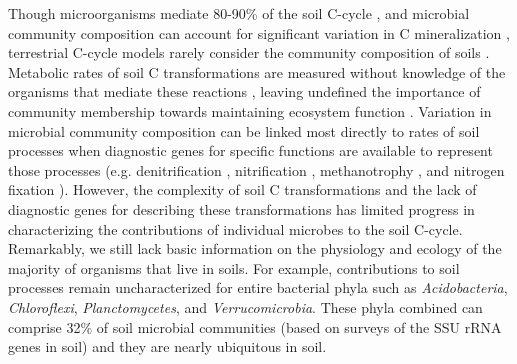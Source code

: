 Though microorganisms mediate 80-90\% of the soil C-cycle
\citep{ColemanCrossley_1996,Nannipieri_2003}, and microbial community
composition can account for significant variation in C mineralization
\citep{Strickland_2009} , terrestrial C-cycle models rarely consider the
community composition of soils \citep{Zak2006,Reed2007}. Metabolic rates of
soil C transformations are measured without knowledge of the organisms that
mediate these reactions \citep{Nannipieri_2003}, leaving undefined the
importance of community membership towards maintaining ecosystem function
\citep{Nannipieri_2003,Schimel_2012,Allison_2008}. Variation in microbial
community composition can be linked most directly to rates of soil processes
when diagnostic genes for specific functions are available to represent those
processes (e.g. denitrification \citep{Cavigelli2000}, nitrification
\citep{Carney2004,Hawkes2005,Webster2005}, methanotrophy \citep{Gulledge1997},
and nitrogen fixation \citep{Hsu2009}). However, the complexity of soil
C transformations and the lack of diagnostic genes for describing
these transformations has limited progress in characterizing the contributions
of individual microbes to the soil C-cycle. Remarkably, we still lack basic
information on the physiology and ecology of the majority of organisms that
live in soils. For example, contributions to soil processes remain
uncharacterized for entire bacterial phyla such as \textit{Acidobacteria},
\textit{Chloroflexi}, \textit{Planctomycetes}, and \textit{Verrucomicrobia}.
These phyla combined can comprise 32\% of soil microbial communities (based on
surveys of the SSU rRNA genes in soil) \citep{Janssen2006,Buckley2002} and they
are nearly ubiquitous in soil. 

